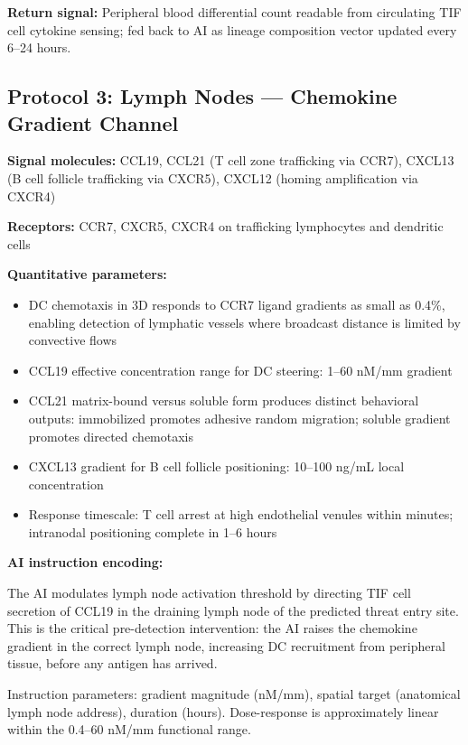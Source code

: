 \documentclass[12pt]{article}
\begin{document}
\textbf{Return signal:} Peripheral blood differential count readable from circulating TIF cell cytokine sensing; fed back to AI as lineage composition vector updated every 6--24 hours.

\subsection{Protocol 3: Lymph Nodes --- Chemokine Gradient Channel}

\textbf{Signal molecules:} CCL19, CCL21 (T cell zone trafficking via CCR7), CXCL13 (B cell follicle trafficking via CXCR5), CXCL12 (homing amplification via CXCR4)

\textbf{Receptors:} CCR7, CXCR5, CXCR4 on trafficking lymphocytes and dendritic cells

\textbf{Quantitative parameters:}
\begin{itemize}
    \item DC chemotaxis in 3D responds to CCR7 ligand gradients as small as 0.4\%, enabling detection of lymphatic vessels where broadcast distance is limited by convective flows \cite{dc_chemotaxis_2011}
    \item CCL19 effective concentration range for DC steering: 1--60 nM/mm gradient
    \item CCL21 matrix-bound versus soluble form produces distinct behavioral outputs: immobilized promotes adhesive random migration; soluble gradient promotes directed chemotaxis
    \item CXCL13 gradient for B cell follicle positioning: 10--100 ng/mL local concentration
    \item Response timescale: T cell arrest at high endothelial venules within minutes; intranodal positioning complete in 1--6 hours
\end{itemize}

\textbf{AI instruction encoding:}

The AI modulates lymph node activation threshold by directing TIF cell secretion of CCL19 in the draining lymph node of the predicted threat entry site. This is the critical pre-detection intervention: the AI raises the chemokine gradient in the correct lymph node, increasing DC recruitment from peripheral tissue, before any antigen has arrived.

Instruction parameters: gradient magnitude (nM/mm), spatial target (anatomical lymph node address), duration (hours). Dose-response is approximately linear within the 0.4--60 nM/mm functional range.
\end{document}
